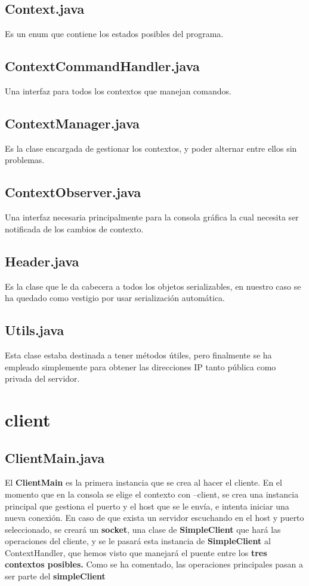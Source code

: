 \documentclass[a4paper, 12pt]{report}
\begin{document}
\section{Context.java}
Es un enum que contiene los estados posibles del programa.
\section{ContextCommandHandler.java}
Una interfaz para todos los contextos que manejan comandos.
\section{ContextManager.java}
Es la clase encargada de gestionar los contextos, y poder alternar entre ellos sin problemas.
\section{ContextObserver.java}
Una interfaz necesaria principalmente para la consola gráfica la cual necesita ser notificada de los cambios de contexto.
\section{Header.java}
Es la clase que le da cabecera a todos los objetos serializables, en nuestro caso se ha quedado como vestigio por usar serialización automática.
\section{Utils.java}
Esta clase estaba destinada a tener métodos útiles, pero finalmente se ha empleado simplemente para obtener las direcciones IP tanto pública como privada del servidor.	

\chapter{client}
\section{ClientMain.java}

El \textbf{ClientMain} es la primera instancia que se crea al hacer el cliente. En el momento que en la consola se elige el contexto con --client, se crea una instancia principal que gestiona el puerto y el host que se le envía, e intenta iniciar una nueva conexión. En caso de que exista un servidor escuchando en el host y puerto seleccionado, se creará un \textbf{socket}, una clase de \textbf{SimpleClient} que hará las operaciones del cliente, y se le pasará esta instancia de \textbf{SimpleClient} al ContextHandler, que hemos visto que manejará el puente entre los \textbf{tres contextos posibles.}
Como se ha comentado, las operaciones principales pasan a ser parte del \textbf{simpleClient}
\end{document}
